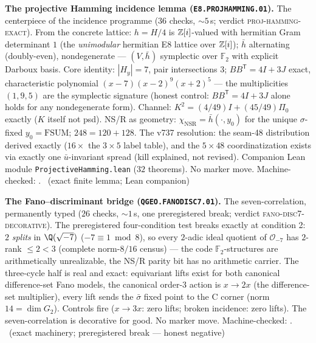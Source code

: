 \par\smallskip\noindent\textbf{The projective Hamming incidence lemma
(\texttt{E8.PROJHAMMING.01}).}
The centerpiece of the incidence programme ($36$ checks,
${\sim}5$\,s; verdict \textsc{proj-hamming-exact}).  From the
concrete lattice: $h=H/4$ is $\mathbb{Z}[i]$-valued with hermitian Gram
determinant $1$ (the \emph{unimodular} hermitian E8 lattice over
$\mathbb{Z}[i]$); $\bar h$ alternating (doubly-even), nondegenerate ---
$(V,\bar h)$ symplectic over $\mathbb{F}_2$ with explicit Darboux
basis.  Core identity: $|H_y|=7$, pair intersections $3$;
$BB^{\mathsf T}=4I+3J$ exact, characteristic polynomial
$(x-7)(x-2)^9(x+2)^5$ --- the multiplicities $(1,9,5)$ are the
symplectic signature (honest control: $BB^{\mathsf T}=4I+3J$ alone
holds for any nondegenerate form).  Channel:
$K^2=(4/49)I+(45/49)\Pi_0$ exactly ($K$ itself not psd).  NS/R as
geometry: $\chi_{\mathrm{NSR}}=\bar h(\cdot,y_0)$ for the unique
$\sigma$-fixed $y_0=\mathrm{FSUM}$; $248=120+128$.  The v737
resolution: the seam-48 distribution derived exactly ($16\times$
the $3\times5$ label table), and the $5\times48$ coordinatization
exists via exactly one $\bar u$-invariant spread (kill explained,
not revised).  Companion Lean module
\texttt{ProjectiveHamming.lean} ($32$ theorems).  No marker move.
Machine-checked: .
\mE\ (exact finite lemma; Lean companion)
\par\smallskip

\par\smallskip\noindent\textbf{The Fano--discriminant bridge
(\texttt{QGEO.FANODISC7.01}).}
The seven-correlation, permanently typed ($26$ checks, ${\sim}1$\,s,
one preregistered break; verdict \textsc{fano-disc7-decorative}).
The preregistered four-condition test breaks exactly at condition 2:
$2$ \emph{splits} in $\Q(\sqrt{-7})$ ($-7\equiv1\bmod8$), so every
$2$-adic ideal quotient of $\mathcal O_{-7}$ has $2$-rank
$\le2<3$ (complete norm-$8/16$ census) --- the code
$\mathbb{F}_2$-structures are arithmetically unrealizable, the
NS/R parity bit has no arithmetic carrier.  The three-cycle half is
real and exact: equivariant lifts exist for both canonical
difference-set Fano models, the canonical order-$3$ action is
$x\to2x$ (the difference-set multiplier), every lift sends the
$\bar\sigma$ fixed point to the C corner (norm $14=\dim G_2$).
Controls fire ($x\to3x$: zero lifts; broken incidence: zero lifts).
The seven-correlation is decorative for good.  No marker move.
Machine-checked: .
\mE\ (exact machinery; preregistered break --- honest negative)
\par\smallskip


